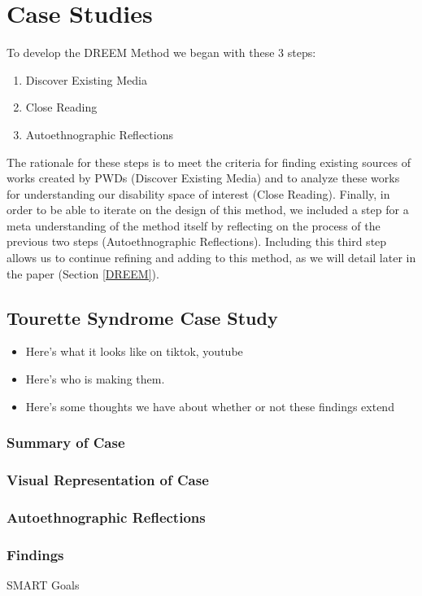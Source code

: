 \section{Case Studies} \label{CaseStudies}
To develop the DREEM Method we began with these 3 steps:
\begin{enumerate}
\item Discover Existing Media
\item Close Reading
\item Autoethnographic Reflections
\end{enumerate}
The rationale for these steps is to meet the criteria for finding existing sources of works created by PWDs (Discover Existing Media) and to analyze these works for understanding our disability space of interest (Close Reading). Finally, in order to be able to iterate on the design of this method, we included a step for a meta understanding of the method itself by reflecting on the process of the previous two steps (Autoethnographic Reflections). Including this third step allows us to continue refining and adding to this method, as we will detail later in the paper (Section \ref{DREEM}).

\subsection{Tourette Syndrome Case Study}
\begin{itemize}
\item Here's what it looks like on tiktok, youtube 
\item Here's who is making them. 
\item Here's some thoughts we have about whether or not these findings extend
\end{itemize}


\subsubsection{Summary of Case}

\subsubsection{Visual Representation of Case}

\subsubsection{Autoethnographic Reflections}

\subsubsection{Findings}
SMART Goals


